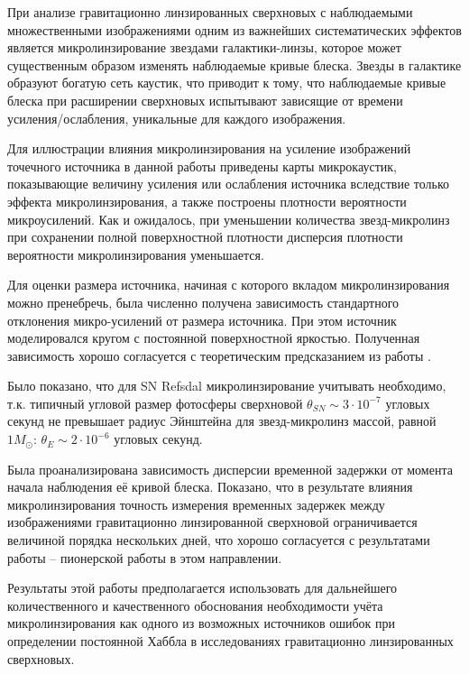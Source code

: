 При анализе гравитационно линзированных сверхновых с наблюдаемыми множественными изображениями одним из важнейших систематических эффектов является микролинзирование звездами галактики-линзы, которое может существенным образом изменять наблюдаемые кривые блеска. Звезды в галактике образуют богатую сеть каустик, что приводит к тому, что наблюдаемые кривые блеска при расширении сверхновых испытывают зависящие от времени усиления/ослабления, уникальные для каждого изображения.

Для иллюстрации влияния микролинзирования на усиление изображений точечного источника в данной работы приведены карты микрокаустик, показывающие величину усиления или ослабления источника вследствие только эффекта микролинзирования, а также построены плотности вероятности микроусилений. Как и ожидалось, при уменьшении количества звезд-микролинз при сохранении полной поверхностной плотности дисперсия плотности вероятности микролинзирования уменьшается.

Для оценки размера источника, начиная с которого вкладом микролинзирования можно пренебречь, была численно получена зависимость стандартного отклонения микро-усилений от размера источника. При этом источник моделировался кругом с постоянной поверхностной яркостью. Полученная зависимость хорошо согласуется с теоретическим предсказанием из работы \cite{refsdalstabell1991}. 

Было показано, что для SN Refsdal микролинзирование учитывать необходимо, т.к. типичный угловой размер фотосферы сверхновой $\theta_{SN} \sim 3 \cdot 10^{-7}$ угловых секунд не превышает радиус Эйнштейна для звезд-микролинз массой, равной $1 M_{\odot}$: $\theta_E \sim 2 \cdot 10^{-6}$ угловых секунд.

Была проанализирована зависимость дисперсии временной задержки от момента начала наблюдения её кривой блеска. Показано, что в результате влияния микролинзирования точность измерения временных задержек между изображениями гравитационно линзированной сверхновой ограничивается величиной порядка нескольких дней, что хорошо согласуется с результатами работы \cite{doblerkeeton2006} -- пионерской работы в этом направлении.

Результаты этой работы предполагается использовать для дальнейшего количественного и качественного обоснования необходимости учёта микролинзирования как одного из возможных источников ошибок при определении постоянной Хаббла в исследованиях гравитационно линзированных сверхновых.

